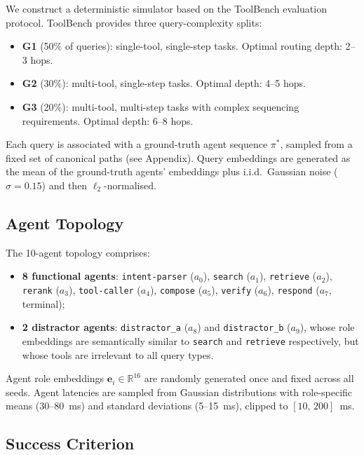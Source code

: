 \documentclass[journal,twocolumn,letterpaper]{IEEEtran}
\newcommand{\RR}{\mathbb{R}}
\begin{document}
We construct a deterministic simulator based on the ToolBench
\cite{qin2024toolllm} evaluation protocol.  ToolBench provides three
query-complexity splits:
\begin{itemize}
  \item \textbf{G1} (50\% of queries): single-tool, single-step tasks.
        Optimal routing depth: 2--3 hops.
  \item \textbf{G2} (30\%): multi-tool, single-step tasks.
        Optimal depth: 4--5 hops.
  \item \textbf{G3} (20\%): multi-tool, multi-step tasks with complex
        sequencing requirements.  Optimal depth: 6--8 hops.
\end{itemize}
Each query is associated with a ground-truth agent sequence $\pi^*$, sampled
from a fixed set of canonical paths (see Appendix).  Query embeddings are
generated as the mean of the ground-truth agents' embeddings plus i.i.d.\
Gaussian noise ($\sigma=0.15$) and then $\ell_2$-normalised.

\subsection{Agent Topology}

The 10-agent topology comprises:
\begin{itemize}
  \item \textbf{8 functional agents}: \texttt{intent-parser} ($a_0$),
        \texttt{search} ($a_1$), \texttt{retrieve} ($a_2$),
        \texttt{rerank} ($a_3$), \texttt{tool-caller} ($a_4$),
        \texttt{compose} ($a_5$), \texttt{verify} ($a_6$),
        \texttt{respond} ($a_7$, terminal);
  \item \textbf{2 distractor agents}: \texttt{distractor\_a} ($a_8$) and
        \texttt{distractor\_b} ($a_9$), whose role embeddings are
        semantically similar to \texttt{search} and \texttt{retrieve}
        respectively, but whose tools are irrelevant to all query types.
\end{itemize}
Agent role embeddings $\mathbf{e}_i\in\RR^{16}$ are randomly generated
once and fixed across all seeds.  Agent latencies are sampled from
Gaussian distributions with role-specific means (30--80~ms) and standard
deviations (5--15~ms), clipped to $[10,\,200]$~ms.

\subsection{Success Criterion}
\end{document}
